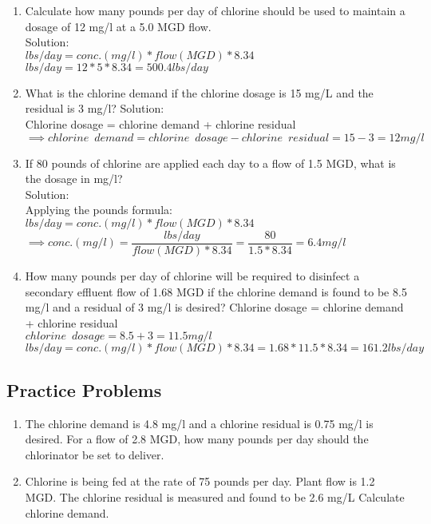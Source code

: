 \begin{enumerate}

\item Calculate how many pounds per day of chlorine should be used to maintain a dosage of 12 mg/l at a 5.0 MGD flow.\\
Solution:\\
$lbs/day=conc. (mg/l)*flow(MGD)*8.34$\\
$lbs/day=12*5*8.34=\boxed{500.4lbs/day}$\\
\item What is the chlorine demand if the chlorine dosage is 15 mg/L and the residual is 3 mg/l?
Solution:\\
Chlorine dosage = chlorine demand + chlorine residual\\
$\implies chlorine \enspace demand = chlorine \enspace dosage - chlorine \enspace residual=15-3=\boxed{12mg/l}$
\item If 80 pounds of chlorine are applied each day to a flow of 1.5 MGD, what is the dosage in mg/l?\\
Solution:\\
Applying the pounds formula:\\  $lbs/day=conc. (mg/l)*flow(MGD)*8.34$\\
$\implies conc. (mg/l)=\dfrac{lbs/day}{flow(MGD)*8.34}=\dfrac{80}{1.5*8.34}=\boxed{6.4mg/l}$
\item How many pounds per day of chlorine will be required to disinfect a secondary effluent flow of 1.68 MGD if the chlorine demand is found to be 8.5 mg/l and a residual of 3 mg/l is desired?
Chlorine dosage = chlorine demand + chlorine residual\\
$chlorine \enspace dosage=8.5+3=11.5mg/l$\\
$lbs/day=conc. (mg/l)*flow(MGD)*8.34=1.68*11.5*8.34=\boxed{161.2lbs/day}$\\


\end{enumerate}

\subsection{Practice Problems} 

\begin{enumerate}


\item The chlorine demand is 4.8 mg/l and a chlorine residual is 0.75 mg/l is desired. For a flow of 2.8 MGD, how many pounds per day should the chlorinator be set to deliver.\\

\item Chlorine is being fed at the rate of 75 pounds per day. Plant flow is 1.2 MGD. The chlorine residual is measured and found to be 2.6 mg/L Calculate chlorine demand.\\


\end{enumerate}

